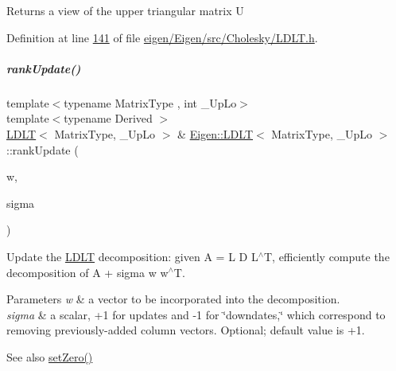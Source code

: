 \begin{DoxyReturn}{Returns}
a view of the upper triangular matrix U 
\end{DoxyReturn}


Definition at line \hyperlink{eigen_2_eigen_2src_2_cholesky_2_l_d_l_t_8h_source_l00141}{141} of file \hyperlink{eigen_2_eigen_2src_2_cholesky_2_l_d_l_t_8h_source}{eigen/\+Eigen/src/\+Cholesky/\+L\+D\+L\+T.\+h}.

\mbox{\label{group___cholesky___module_a59a415ea2ba2d6208233da42f981579a}} 
\subparagraph{\texorpdfstring{rank\+Update()}{rankUpdate()}}
{\footnotesize\ttfamily template$<$typename Matrix\+Type , int \+\_\+\+Up\+Lo$>$ \\
template$<$typename Derived $>$ \\
\hyperlink{group___cholesky___module_class_eigen_1_1_l_d_l_t}{L\+D\+LT}$<$ Matrix\+Type, \+\_\+\+Up\+Lo $>$ \& \hyperlink{group___cholesky___module_class_eigen_1_1_l_d_l_t}{Eigen\+::\+L\+D\+LT}$<$ Matrix\+Type, \+\_\+\+Up\+Lo $>$\+::rank\+Update (\begin{DoxyParamCaption}\item[{const \hyperlink{group___core___module_class_eigen_1_1_matrix_base}{Matrix\+Base}$<$ Derived $>$ \&}]{w,  }\item[{const typename \hyperlink{group___cholesky___module_class_eigen_1_1_l_d_l_t}{L\+D\+LT}$<$ Matrix\+Type, \+\_\+\+Up\+Lo $>$\+::Real\+Scalar \&}]{sigma }\end{DoxyParamCaption})}

Update the \hyperlink{group___cholesky___module_class_eigen_1_1_l_d_l_t}{L\+D\+LT} decomposition\+: given A = L D L$^\wedge$T, efficiently compute the decomposition of A + sigma w w$^\wedge$T. 
\begin{DoxyParams}{Parameters}
{\em w} & a vector to be incorporated into the decomposition. \\
\hline
{\em sigma} & a scalar, +1 for updates and -\/1 for \char`\"{}downdates,\char`\"{} which correspond to removing previously-\/added column vectors. Optional; default value is +1. \\
\hline
\end{DoxyParams}
\begin{DoxySeeAlso}{See also}
\hyperlink{group___cholesky___module_a776d0ab6c980847297d25b03b5d2216a}{set\+Zero()} 
\end{DoxySeeAlso}


